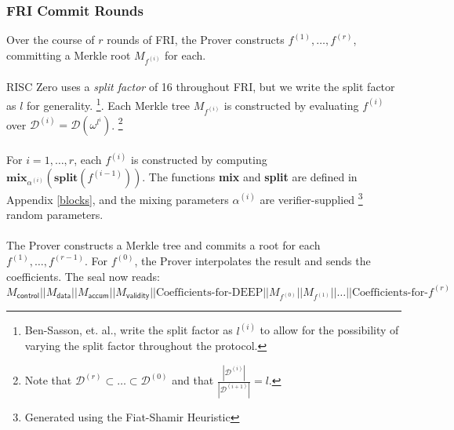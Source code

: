 \documentclass[10pt,letterpaper,titlepage]{article}
\newcommand{\w}[0]{\omega}
\newcommand{\D}[0]{\mathcal{D}}
\theoremstyle{definition}
\begin{document}
\begin{appendices}
\subsubsection*{FRI Commit Rounds}
Over the course of $r$ rounds of FRI, the Prover constructs $f^{(1)},\ldots,f^{(r)}$, committing a Merkle root $M_{f^{(i)}}$ for each. \\
\\
RISC Zero uses a \textit{split factor} of 16 throughout FRI, but we write the split factor as $l$ for generality.%
\footnote{Ben-Sasson, et. al., write the split factor as $l^{(i)}$ to allow for the possibility of varying the split factor throughout the protocol.}.
Each Merkle tree $M_{f^{(i)}}$ is constructed by evaluating $f^{(i)}$ over $\D^{(i)}=\D(\w^{l^i})$.%
\footnote{Note that $\D^{(r)}\subset\ldots\subset\D^{(0)}$ and that $\frac{|\D^{(i)}|}{|\D^{(i+1)}|}=l$.}
\\
\\For $i=1,\ldots,r$, each $f^{(i)}$ is constructed by computing $\textbf{mix}_{\alpha^{(i)}}(\textbf{split}(f^{(i-1)}))$.
The functions \textbf{mix} and \textbf{split} are defined in Appendix \ref{blocks}, and the mixing parameters $\alpha^{(i)}$ are verifier-supplied%
\footnote{Generated using the Fiat-Shamir Heuristic} random parameters.\\
\\
The Prover constructs a Merkle tree and commits a root for each $f^{(1)},\ldots,f^{(r-1)}$.
For $f^{(0)}$, the Prover interpolates the result and sends the coefficients.
The seal now reads:
\[
  M_\mathsf{control}||
  M_\mathsf{data}||
  M_\mathsf{accum}||
  M_\mathsf{validity}||
  \text{Coefficients-for-DEEP}||
  M_{f^{(0)}}||
  M_{f^{(1)}}||
  \ldots||
  \text{Coefficients-for-}f^{(r)}
\]


\end{appendices}
\end{document}
